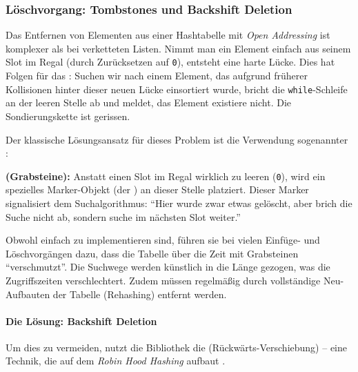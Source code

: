 
\subsubsection{Löschvorgang: Tombstones und Backshift Deletion}
\label{subsubsec:rs-intern-backshift}

Das Entfernen von Elementen aus einer Hashtabelle mit \textit{Open Addressing} ist komplexer als bei verketteten Listen. Nimmt man ein Element einfach aus seinem Slot im Regal (durch Zurücksetzen auf \texttt{0}), entsteht eine harte Lücke. Dies hat Folgen für das \textit{}: Suchen wir nach einem Element, das aufgrund früherer Kollisionen hinter dieser neuen Lücke einsortiert wurde, bricht die \texttt{while}-Schleife an der leeren Stelle ab und meldet, das Element existiere nicht. Die Sondierungskette ist gerissen.

Der klassische Lösungsansatz für dieses Problem ist die Verwendung sogenannter :

\begin{definition}
\label{def:tombstones}
\textbf{ (Grabsteine):} Anstatt einen Slot im Regal wirklich zu leeren (\texttt{0}), wird ein spezielles Marker-Objekt (der ) an dieser Stelle platziert. Dieser Marker signalisiert dem Suchalgorithmus: \enquote{Hier wurde zwar etwas gelöscht, aber brich die Suche nicht ab, sondern suche im nächsten Slot weiter.}
\end{definition}

Obwohl  einfach zu implementieren sind, führen sie bei vielen Einfüge- und Löschvorgängen dazu, dass die Tabelle über die Zeit mit Grabsteinen \enquote{verschmutzt}. Die Suchwege werden künstlich in die Länge gezogen, was die Zugriffszeiten verschlechtert. Zudem müssen  regelmäßig durch vollständige Neu-Aufbauten der Tabelle (Rehashing) entfernt werden.

\paragraph*{Die Lösung: Backshift Deletion}
Um dies zu vermeiden, nutzt die Bibliothek die \textit{} (Rückwärts-Verschiebung) – eine Technik, die auf dem \textit{Robin Hood Hashing} aufbaut \autocite{celis1986robin}. 

